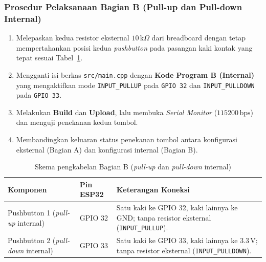 \subsubsection*{Prosedur Pelaksanaan Bagian B (Pull-up dan Pull-down Internal)}
\begin{enumerate}[label=\arabic*.]
    \item Melepaskan kedua resistor eksternal $10\,\text{k}\Omega$ dari breadboard dengan tetap mempertahankan posisi kedua \textit{pushbutton} pada pasangan kaki kontak yang tepat sesuai Tabel~\ref{tab:wiring_pull_internal}.
    \item Mengganti isi berkas \texttt{src/main.cpp} dengan \textbf{Kode Program B (Internal)} yang mengaktifkan mode \texttt{INPUT\_PULLUP} pada \texttt{GPIO 32} dan \texttt{INPUT\_PULLDOWN} pada \texttt{GPIO 33}.
    \item Melakukan \textbf{Build} dan \textbf{Upload}, lalu membuka \textit{Serial Monitor} ($115200\,\text{bps}$) dan menguji penekanan kedua tombol.
    \item Membandingkan keluaran status penekanan tombol antara konfigurasi eksternal (Bagian A) dan konfigurasi internal (Bagian B).
\end{enumerate}

\begin{table}[htbp]
    \centering
    \caption{Skema pengkabelan Bagian B (\textit{pull-up} dan \textit{pull-down} internal)}
    \label{tab:wiring_pull_internal}
    \begin{tabularx}{\textwidth}{l l X}
        \toprule
        \textbf{Komponen} & \textbf{Pin ESP32} & \textbf{Keterangan Koneksi} \\
        \midrule
        Pushbutton 1 (\textit{pull-up} internal)   & GPIO 32 & Satu kaki ke GPIO 32, kaki lainnya ke GND; tanpa resistor eksternal (\texttt{INPUT\_PULLUP}). \\
        Pushbutton 2 (\textit{pull-down} internal) & GPIO 33 & Satu kaki ke GPIO 33, kaki lainnya ke $3.3\,\text{V}$; tanpa resistor eksternal (\texttt{INPUT\_PULLDOWN}). \\
        \bottomrule
    \end{tabularx}
\end{table}

